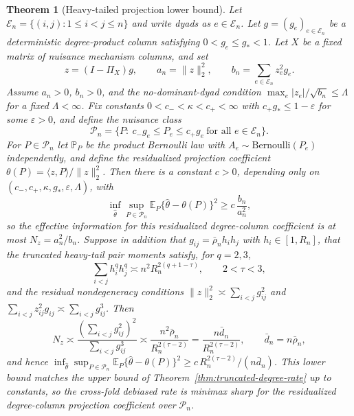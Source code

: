 \documentclass[12pt]{article}
\newtheorem{theorem}{Theorem}
\newcommand{\1}{\mathbf{1}}
\begin{document}
\begin{theorem}[Heavy-tailed projection lower bound]
\label{thm:heavy-tail-projection-lb}
Let $\mathcal E_n=\{(i,j):1\le i<j\le n\}$ and write dyads as $e\in\mathcal E_n$. Let
$g=(g_e)_{e\in\mathcal E_n}$ be a deterministic degree-product column satisfying $0<g_e\le g_*<1$. Let
$X$ be a fixed matrix of nuisance mechanism columns, and set
\[
    z=(I-\Pi_X)g,\qquad a_n=\|z\|_2^2,\qquad b_n=\sum_{e\in\mathcal E_n} z_e^2 g_e .
\]
Assume $a_n>0$, $b_n>0$, and the no-dominant-dyad condition $\max_{e}|z_e|/\sqrt{b_n}\le\Lambda$ for a
fixed $\Lambda<\infty$. Fix constants $0<c_-<\kappa<c_+<\infty$ with $c_+g_*\le 1-\varepsilon$ for some
$\varepsilon>0$, and define the nuisance class
\[
    \mathcal P_n=\bigl\{P:\ c_-g_e\le P_e\le c_+g_e\ \text{for all }e\in\mathcal E_n\bigr\}.
\]
For $P\in\mathcal P_n$ let $\mathbb P_P$ be the product Bernoulli law with $A_e\sim\mathrm{Bernoulli}(P_e)$
independently, and define the residualized projection coefficient
$\theta(P)=\langle z,P\rangle/\|z\|_2^2$. Then there is a constant $c>0$, depending only on
$(c_-,c_+,\kappa,g_*,\varepsilon,\Lambda)$, with
\[
    \inf_{\widehat\theta}\sup_{P\in\mathcal P_n}\mathbb E_P\{\widehat\theta-\theta(P)\}^2
    \ge c\,\frac{b_n}{a_n^2},
\]
so the effective information for this residualized degree-column coefficient is at most
$N_z=a_n^2/b_n$. Suppose in addition that $g_{ij}=\bar\rho_n h_ih_j$ with $h_i\in[1,R_n]$, that the
truncated heavy-tail pair moments satisfy, for $q=2,3$,
\[
    \sum_{i<j}h_i^q h_j^q\asymp n^2 R_n^{2(q+1-\tau)},\qquad 2<\tau<3,
\]
and the residual nondegeneracy conditions $\|z\|_2^2\asymp\sum_{i<j}g_{ij}^2$ and
$\sum_{i<j}z_{ij}^2 g_{ij}\asymp\sum_{i<j}g_{ij}^3$. Then
\[
    N_z\asymp\frac{(\sum_{i<j}g_{ij}^2)^2}{\sum_{i<j}g_{ij}^3}
    \asymp\frac{n^2\bar\rho_n}{R_n^{2(\tau-2)}}=\frac{n\bar d_n}{R_n^{2(\tau-2)}},
    \qquad \bar d_n=n\bar\rho_n,
\]
and hence $\inf_{\widehat\theta}\sup_{P\in\mathcal P_n}\mathbb E_P\{\widehat\theta-\theta(P)\}^2\ge
c\,R_n^{2(\tau-2)}/(n\bar d_n)$. This lower bound matches the upper bound of
Theorem~\ref{thm:truncated-degree-rate} up to constants, so the cross-fold debiased rate is minimax
sharp for the residualized degree-column projection coefficient over $\mathcal P_n$.
\end{theorem}
\end{document}
